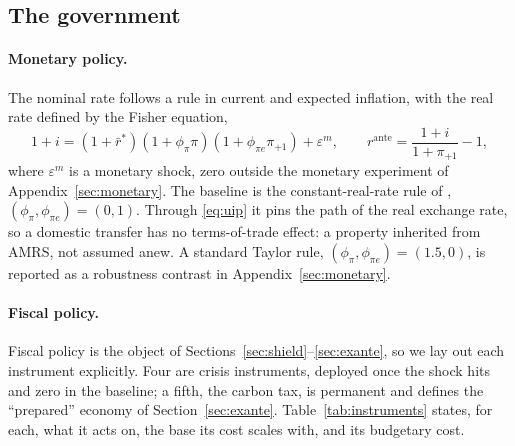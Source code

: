 \subsection{The government}\label{sec:gov}

\paragraph{Monetary policy.}
The nominal rate follows a rule in current and expected inflation, with the
real rate defined by the Fisher equation,
%
\begin{equation}
1+i=(1+\bar r^{*})(1+\phi_\pi\pi)(1+\phi_{\pi e}\pi_{+1})+\varepsilon^m,
\qquad
r^{\mathrm{ante}}=\frac{1+i}{1+\pi_{+1}}-1,
\label{eq:mp}
\end{equation}
%
where $\varepsilon^m$ is a monetary shock, zero outside the monetary
experiment of Appendix~\ref{sec:monetary}. The baseline is the constant-real-rate
rule of \citet{ARS2024}, $(\phi_\pi,\phi_{\pi e})=(0,1)$. Through \eqref{eq:uip} it
pins the path of the real exchange rate, so a domestic transfer has no
terms-of-trade effect: a property inherited from AMRS, not assumed anew. A standard
Taylor rule, $(\phi_\pi,\phi_{\pi e})=(1.5,0)$, is reported as a robustness
contrast in Appendix~\ref{sec:monetary}.

\paragraph{Fiscal policy.}
Fiscal policy is the object of Sections~\ref{sec:shield}--\ref{sec:exante}, so we lay
out each instrument explicitly. Four are crisis instruments, deployed once the shock
hits and zero in the baseline; a fifth, the carbon tax, is permanent and defines the
``prepared'' economy of Section~\ref{sec:exante}. Table~\ref{tab:instruments} states,
for each, what it acts on, the base its cost scales with, and its budgetary cost.

